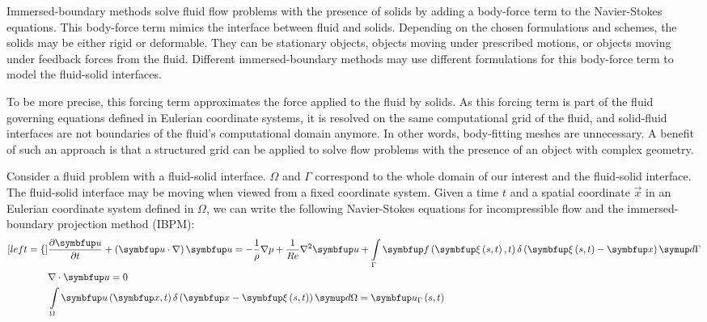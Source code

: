 
Immersed-boundary methods solve fluid flow problems with the presence of solids by adding a body-force term to the Navier-Stokes equations.
This body-force term mimics the interface between fluid and solids.
Depending on the chosen formulations and schemes, the solids may be either rigid or deformable.
They can be stationary objects, objects moving under prescribed motions, or objects moving under feedback forces from the fluid.
Different immersed-boundary methods may use different formulations for this body-force term to model the fluid-solid interfaces.

To be more precise, this forcing term approximates the force applied to the fluid by solids.
As this forcing term is part of the fluid governing equations defined in Eulerian coordinate systems, it is resolved on the same computational grid of the fluid, and solid-fluid interfaces are not boundaries of the fluid's computational domain anymore.
In other words, body-fitting meshes are unnecessary.
A benefit of such an approach is that a structured grid can be applied to solve flow problems with the presence of an object with complex geometry.

Consider a fluid problem with a fluid-solid interface.
$\Omega$ and $\Gamma$ correspond to the whole domain of our interest and the fluid-solid interface.
The fluid-solid interface may be moving when viewed from a fixed coordinate system.
Given a time $t$ and a spatial coordinate $\vec{x}$ in an Eulerian coordinate system defined in $\Omega$, we can write the following Navier-Stokes equations for incompressible flow and the immersed-boundary projection method (IBPM):
\begin{subequations}\label{eq:mod-ns}
    \begin{align}[left=\empheqlbrace\,]
        &\pdiff{\vec{u}}{t} + \left(\vec{u} \cdot \nabla\right) \vec{u}
            =
            -\frac{1}{\rho}\nabla p + \frac{1}{Re} \nabla^2 \vec{u} + 
            \int\limits_{\Gamma} \vec{f}\left(\vec{\xi}\left(s, t \right), t\right) \delta\left(\vec{\xi}\left(s, t\right)-\vec{x}\right)\diff {\Gamma} 
            \label{eq:mod-ns-momentum} \\
        &\nabla \cdot \vec{u} = 0 \label{eq:mod-ns-cont}\\
        &\int\limits_{\Omega} \vec{u}\left(\vec{x}, t\right) \delta \left(\vec{x}-\vec{\xi}\left(s, t\right)\right)\diff\Omega
            =
            \vec{u}_{\Gamma}\left(s, t\right)
            \label{eq:mod-ns-body-vel}
    \end{align}
\end{subequations}


